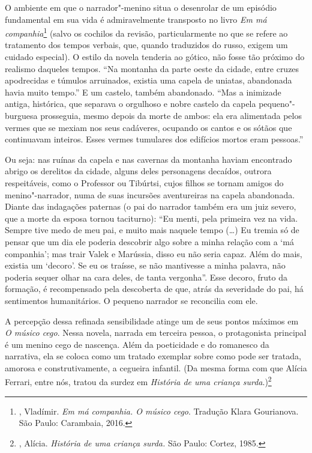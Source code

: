 O ambiente em que o narrador"-menino situa o desenrolar de um episódio
fundamental em sua vida é admiravelmente transposto no livro \emph{Em má
companhia}\footnote{, Vladímir. \emph{Em má companhia. O músico
  cego}. Tradução Klara Gourianova. São Paulo: Carambaia, 2016.} (salvo
os cochilos da revisão, particularmente no que se refere ao tratamento
dos tempos verbais, que, quando traduzidos do russo, exigem um
cuidado especial). O estilo da novela tenderia ao gótico, não fosse tão
próximo do realismo daqueles tempos. ``Na montanha da parte oeste da
cidade, entre cruzes apodrecidas e túmulos arruinados, existia uma
capela de uniatas, abandonada havia muito tempo.'' E um castelo, também
abandonado. ``Mas a inimizade antiga, histórica, que separava o
orgulhoso e nobre castelo da capela pequeno"-burguesa prosseguia,
mesmo depois da morte de ambos: ela era alimentada pelos vermes
que se mexiam nos seus cadáveres, ocupando os cantos e os sótãos
que continuavam inteiros. Esses vermes tumulares dos edifícios
mortos eram pessoas.''

Ou seja: nas ruínas da capela e nas cavernas da montanha haviam
encontrado abrigo os derelitos da cidade, alguns deles personagens
decaídos, outrora respeitáveis, como o Professor ou Tibúrtsi, cujos
filhos se tornam amigos do menino"-narrador, numa de suas incursões
aventureiras na capela abandonada. Diante das indagações paternas (o pai
do narrador também era um juiz severo, que a morte da esposa tornou
taciturno): ``Eu menti, pela primeira vez na vida. Sempre tive medo de
meu pai, e muito mais naquele tempo (\ldots{}) Eu tremia só de pensar que um
dia ele poderia descobrir algo sobre a minha relação com a `má
companhia'; mas trair Valek e Marússia, disso eu não seria capaz. Além
do mais, existia um `decoro'. Se eu os traísse, se não mantivesse a
minha palavra, não poderia sequer olhar na cara deles, de tanta
vergonha''. Esse decoro, fruto da formação, é recompensado pela
descoberta de que, atrás da severidade do pai, há sentimentos
humanitários. O pequeno narrador se reconcilia com ele.

A percepção dessa refinada sensibilidade atinge um de seus pontos
máximos em \emph{O músico cego}. Nessa novela, narrada em terceira
pessoa, o protagonista principal é um menino cego de nascença. Além
da poeticidade e do romanesco da narrativa, ela se coloca como um
tratado exemplar sobre como pode ser tratada, amorosa e construtivamente,
a cegueira infantil. (Da mesma forma com que Alícia Ferrari, entre nós,
tratou da surdez em \emph{História de uma criança
surda}.)\footnote{, Alícia. \emph{História de uma
criança surda.} São Paulo: Cortez, 1985.}

